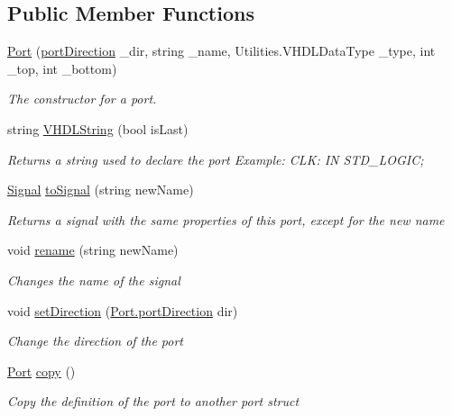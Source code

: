 \subsection*{Public Member Functions}
\begin{DoxyCompactItemize}
\item 
\hyperlink{class_n_n_gen_1_1_port_a2b360d742ee9a3b11e4c9f95b8a7a956}{Port} (\hyperlink{class_n_n_gen_1_1_port_ac3b8f11a7a6bd6872e6954b64721d90c}{port\+Direction} \+\_\+dir, string \+\_\+name, Utilities.\+V\+H\+D\+L\+Data\+Type \+\_\+type, int \+\_\+top, int \+\_\+bottom)
\begin{DoxyCompactList}\small\item\em The constructor for a port. \end{DoxyCompactList}\item 
string \hyperlink{class_n_n_gen_1_1_port_adc50095d3117b0a845e223c5d4502bf1}{V\+H\+D\+L\+String} (bool is\+Last)
\begin{DoxyCompactList}\small\item\em Returns a string used to declare the port Example\+: C\+L\+K\+: I\+N S\+T\+D\+\_\+\+L\+O\+G\+I\+C; \end{DoxyCompactList}\item 
\hyperlink{class_n_n_gen_1_1_signal}{Signal} \hyperlink{class_n_n_gen_1_1_port_ab58db29cb073ac7297104720f1580214}{to\+Signal} (string new\+Name)
\begin{DoxyCompactList}\small\item\em Returns a signal with the same properties of this port, except for the new name \end{DoxyCompactList}\item 
void \hyperlink{class_n_n_gen_1_1_port_a7bbd5a0006e1004d9cdaaf82be58fe85}{rename} (string new\+Name)
\begin{DoxyCompactList}\small\item\em Changes the name of the signal \end{DoxyCompactList}\item 
void \hyperlink{class_n_n_gen_1_1_port_ad830585db8a043e70c9210797dc80500}{set\+Direction} (\hyperlink{class_n_n_gen_1_1_port_ac3b8f11a7a6bd6872e6954b64721d90c}{Port.\+port\+Direction} dir)
\begin{DoxyCompactList}\small\item\em Change the direction of the port \end{DoxyCompactList}\item 
\hyperlink{class_n_n_gen_1_1_port}{Port} \hyperlink{class_n_n_gen_1_1_port_a0dbe21338296f8a5e624b9fe4bbb001f}{copy} ()
\begin{DoxyCompactList}\small\item\em Copy the definition of the port to another port struct \end{DoxyCompactList}\end{DoxyCompactItemize}
